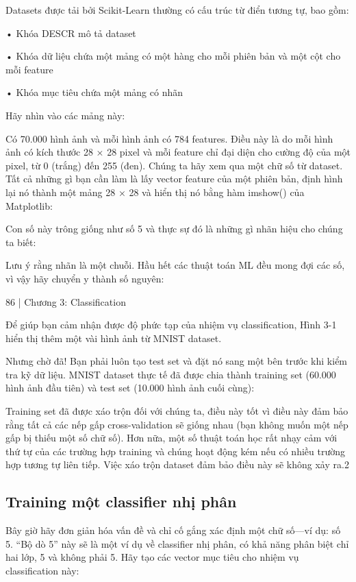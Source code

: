 Datasets được tải bởi Scikit-Learn thường có cấu trúc từ điển tương tự, bao gồm:

• Khóa DESCR mô tả dataset

• Khóa dữ liệu chứa một mảng có một hàng cho mỗi phiên bản và một cột cho mỗi feature

• Khóa mục tiêu chứa một mảng có nhãn

Hãy nhìn vào các mảng này:

Có 70.000 hình ảnh và mỗi hình ảnh có 784 features. Điều này là do mỗi hình ảnh có kích thước 28 × 28 pixel và mỗi feature chỉ đại diện cho cường độ của một pixel, từ 0 (trắng) đến 255 (đen). Chúng ta hãy xem qua một chữ số từ dataset. Tất cả những gì bạn cần làm là lấy vector feature của một phiên bản, định hình lại nó thành một mảng 28 × 28 và hiển thị nó bằng hàm imshow() của Matplotlib:

Con số này trông giống như số 5 và thực sự đó là những gì nhãn hiệu cho chúng ta biết:

Lưu ý rằng nhãn là một chuỗi. Hầu hết các thuật toán ML đều mong đợi các số, vì vậy hãy chuyển y thành số nguyên:

86 | Chương 3: Classification

Để giúp bạn cảm nhận được độ phức tạp của nhiệm vụ classification, Hình 3-1 hiển thị thêm một vài hình ảnh từ MNIST dataset.

Nhưng chờ đã! Bạn phải luôn tạo test set và đặt nó sang một bên trước khi kiểm tra kỹ dữ liệu. MNIST dataset thực tế đã được chia thành training set (60.000 hình ảnh đầu tiên) và test set (10.000 hình ảnh cuối cùng):

Training set đã được xáo trộn đối với chúng ta, điều này tốt vì điều này đảm bảo rằng tất cả các nếp gấp cross-validation sẽ giống nhau (bạn không muốn một nếp gấp bị thiếu một số chữ số). Hơn nữa, một số thuật toán học rất nhạy cảm với thứ tự của các trường hợp training và chúng hoạt động kém nếu có nhiều trường hợp tương tự liên tiếp. Việc xáo trộn dataset đảm bảo điều này sẽ không xảy ra.2

\subsection{Training một classifier nhị phân}

Bây giờ hãy đơn giản hóa vấn đề và chỉ cố gắng xác định một chữ số—ví dụ: số 5. ​​“Bộ dò 5” này sẽ là một ví dụ về classifier nhị phân, có khả năng phân biệt chỉ hai lớp, 5 và không phải 5. Hãy tạo các vector mục tiêu cho nhiệm vụ classification này:

